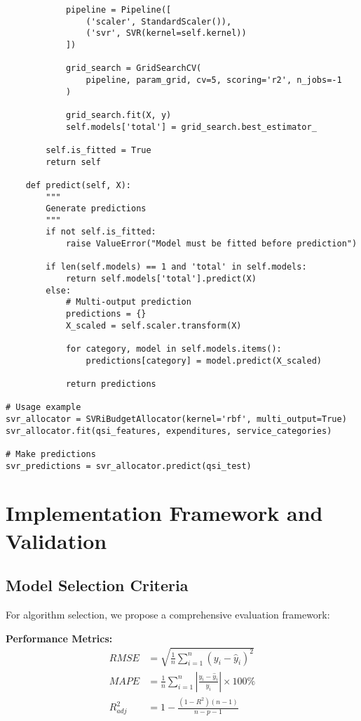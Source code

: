 \documentclass[12pt]{article}
\begin{document}
\begin{lstlisting}
            pipeline = Pipeline([
                ('scaler', StandardScaler()),
                ('svr', SVR(kernel=self.kernel))
            ])
            
            grid_search = GridSearchCV(
                pipeline, param_grid, cv=5, scoring='r2', n_jobs=-1
            )
            
            grid_search.fit(X, y)
            self.models['total'] = grid_search.best_estimator_
        
        self.is_fitted = True
        return self
    
    def predict(self, X):
        """
        Generate predictions
        """
        if not self.is_fitted:
            raise ValueError("Model must be fitted before prediction")
        
        if len(self.models) == 1 and 'total' in self.models:
            return self.models['total'].predict(X)
        else:
            # Multi-output prediction
            predictions = {}
            X_scaled = self.scaler.transform(X)
            
            for category, model in self.models.items():
                predictions[category] = model.predict(X_scaled)
            
            return predictions

# Usage example
svr_allocator = SVRiBudgetAllocator(kernel='rbf', multi_output=True)
svr_allocator.fit(qsi_features, expenditures, service_categories)

# Make predictions
svr_predictions = svr_allocator.predict(qsi_test)
\end{lstlisting}

\section{Implementation Framework and Validation}

\subsection{Model Selection Criteria}

For algorithm selection, we propose a comprehensive evaluation framework:

\textbf{Performance Metrics:}
\begin{align}
RMSE &= \sqrt{\frac{1}{n}\sum_{i=1}^{n}(y_i - \hat{y}_i)^2} \\
MAPE &= \frac{1}{n}\sum_{i=1}^{n}\left|\frac{y_i - \hat{y}_i}{y_i}\right| \times 100\% \\
R^2_{adj} &= 1 - \frac{(1-R^2)(n-1)}{n-p-1}
\end{align}
\end{document}
